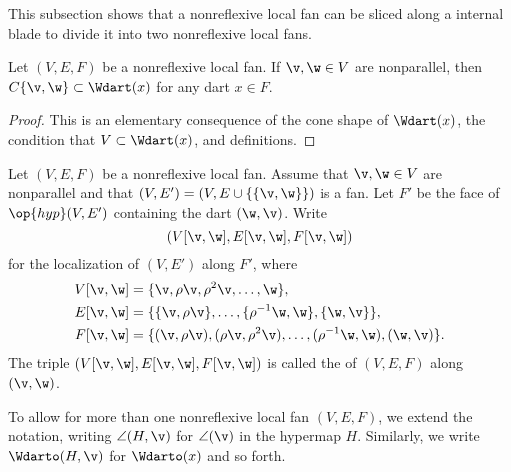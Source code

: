 This subsection shows that a nonreflexive local fan can be sliced
along a internal blade to divide it into two nonreflexive local fans.

\begin{lemma}[]
Let $(V,E,F)$ be a nonreflexive local fan.
If $\v,\w\in V$ are nonparallel, then $C\{\v,\w\} \subset
\Wdart(x)$ for any dart $x\in F$.
\end{lemma}
%

\begin{proof} This is an elementary consequence of
the cone shape of $\Wdart(x)$,  the condition that $V\subset
\Wdart(x)$, and definitions.
\end{proof}






\begin{definition}[slice]
 Let $(V,E,F)$ be a nonreflexive local fan.  Assume that
$\v,\w\in V$ are nonparallel and that $(V,E')=(V,E\cup
\{\{\v,\w\}\})$ is a fan.  Let $F'$ be the face of $\op{hyp}(V,E')$
containing the dart $(\w,\v)$.  Write
\[ (V[\v,\w],E[\v,\w],F[\v,\w])\] 
for the localization of $(V,E')$ along $F'$, where
\begin{align*}
  V[\v,\w] &= \{\v,\rho \v,\rho^2 \v,\ldots,\w\},\\
  E[\v,\w] &= \{\{\v,\rho \v\},\ldots,\{\rho^{-1}\w,\w\},\{\w,\v\}\},\\
  F[\v,\w] &= \{(\v,\rho \v),(\rho \v,\rho^2 \v),
 \ldots,(\rho^{-1}\w,\w),(\w,\v)\}.
\end{align*}
The triple $(V[\v,\w],E[\v,\w],F[\v,\w])$ is called the
 of $(V,E,F)$ along $(\v,\w)$.
\end{definition}
%

To allow for more than one nonreflexive local fan $(V,E,F)$, we  extend
the notation, writing $\angle(H,\v)$ for $\angle(\v)$ in the hypermap
$H$.  Similarly, we write $\Wdarto(H,\v)$ for $\Wdarto(x)$ and so
forth.  %
%


